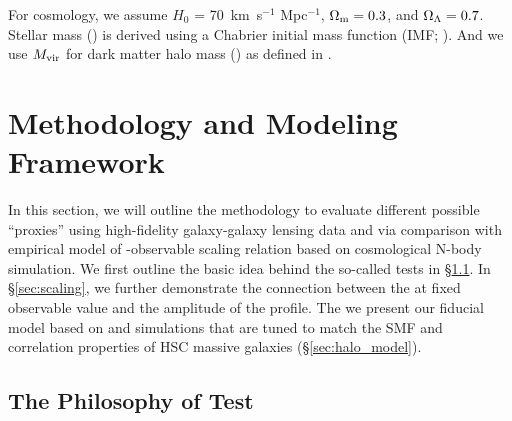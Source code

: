 \documentclass[fleqn,usenatbib,useAMS,english]{mnras}
\begin{document}

    For cosmology, we assume $H_0$ = 70~km~s$^{-1}$ Mpc$^{-1}$,
    ${\Omega}_{\rm m}=0.3$, and ${\Omega}_{\rm \Lambda}=0.7$.
    Stellar mass (\mstar{}) is derived using a Chabrier initial mass function
    (IMF; \citealt{Chabrier2003}).
    And we use $M_{\rm vir}$ for dark matter halo mass (\mhalo{}) as
    defined in \citealt{BryanNorman1998}.


\section{Methodology and Modeling Framework}
    \label{sec:method}

    In this section, we will outline the methodology to evaluate different possible \mvir{}
    ``proxies'' using high-fidelity galaxy-galaxy lensing data and via comparison with empirical
    model of \mvir{}-observable scaling relation based on cosmological N-body simulation.
    We first outline the basic idea behind the so-called \topn{} tests in \S \ref{sec:topn_intro}.
    In \S \ref{sec:scaling}, we further demonstrate the connection between the \sigmh{} at
    fixed observable value and the amplitude of the \dsigma{} profile.
    The we present our fiducial model based on  and \smdpl{} simulations that are
    tuned to match the SMF and correlation properties of HSC massive galaxies
    (\S \ref{sec:halo_model}).


\subsection{The Philosophy of \topn{} Test}
    \label{sec:topn_intro}

\end{document}
